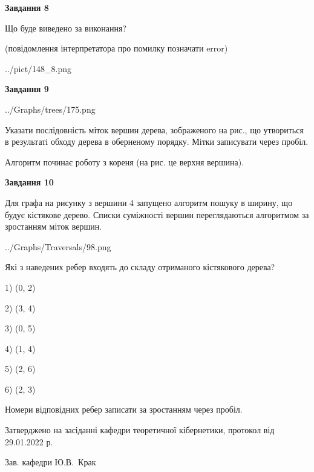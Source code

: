 \documentclass[12pt, ukrainian]{article}
\begin{document}
{\begin {large}
{\begin {center}\textbf{Завдання 8}\end {center}}\par
Що буде виведено за виконання?\par
 (повідомлення інтерпретатора про помилку позначати error)\par
\begin{center}
	{../pict/148_8.png}
\end{center}
\newpage

{\begin {center}\textbf{Завдання 9}\end {center}}\par

\begin{center}
	{../Graphs/trees/175.png}
\end{center}
Указати послідовність міток вершин дерева, зображеного на рис., що утвориться в результаті обходу дерева в оберненому порядку. Мітки записувати через пробіл.\par Алгоритм починає роботу з кореня (на рис. це верхня вершина).\par
\newpage

{\begin {center}\textbf{Завдання 10}\end {center}}\par
Для графа на рисунку з вершини 4 запущено алгоритм пошуку в ширину, що будує кістякове дерево. Списки суміжності вершин переглядаються алгоритмом за зростанням міток вершин.\par
\begin{center}
	{../Graphs/Traversals/98.png}
\end{center}
\par Які з наведених ребер входять до складу отриманого кістякового дерева?\par
1) (0, 2)\par
2) (3, 4)\par
3) (0, 5)\par
4) (1, 4)\par
5) (2, 6)\par
6) (2, 3)\par
{\vskip 15pt} Номери відповідних ребер записати за зростанням через пробіл.\par
\newpage


\end {large}
}
{\smallskip \begin {small} Затверджено на засіданні кафедри теоретичної кібернетики, протокол  від   29.01.2022 р.\par\smallskip\smallskip
{\parbox {6.5 cm}{Зав. кафедри \dotfill Ю.В.~Крак}} \end{small}}
\end{document}
